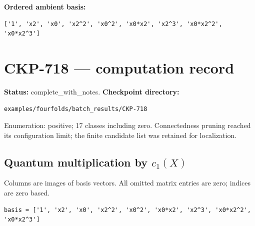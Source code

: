 \documentclass[10pt,a4paper]{article}
\begin{document}
\textbf{Ordered ambient basis:}
\begin{lstlisting}
['1', 'x2', 'x0', 'x2^2', 'x0^2', 'x0*x2', 'x2^3', 'x0*x2^2', 'x0*x2^3']
\end{lstlisting}

\clearpage\section*{CKP-718 --- computation record}
\textbf{Status:} complete\_with\_notes.
\textbf{Checkpoint directory:}
\begin{lstlisting}
examples/fourfolds/batch_results/CKP-718
\end{lstlisting}

Enumeration: positive; 17 classes including zero.
Connectedness pruning reached its configuration limit; the finite candidate list was retained for localization.
\subsection*{Quantum multiplication by $c_1(X)$}
Columns are images of basis vectors. All omitted matrix entries are zero; indices are zero based.

\begin{lstlisting}
basis = ['1', 'x2', 'x0', 'x2^2', 'x0^2', 'x0*x2', 'x2^3', 'x0*x2^2', 'x0*x2^3']
\end{lstlisting}
\end{document}
